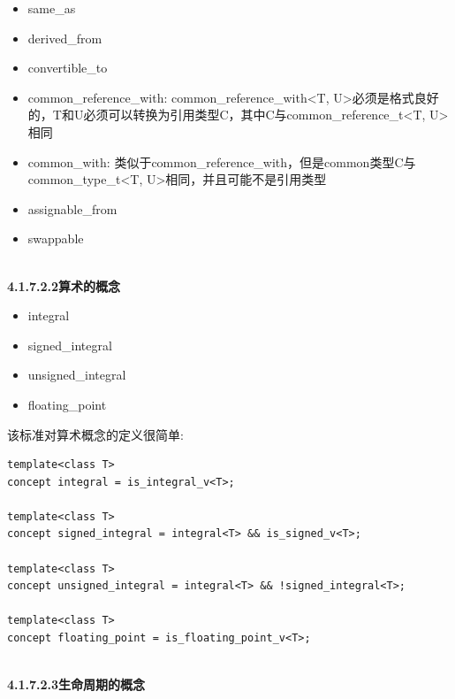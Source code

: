 \begin{itemize}
\item 
same\_as

\item 
derived\_from

\item 
convertible\_to

\item 
common\_reference\_with: common\_reference\_with<T, U>必须是格式良好的，T和U必须可以转换为引用类型C，其中C与common\_reference\_t<T, U>相同

\item 
common\_with: 类似于common\_reference\_with，但是common类型C与common\_type\_t<T, U>相同，并且可能不是引用类型

\item 
assignable\_from

\item 
swappable
\end{itemize}

\hspace*{\fill} \\ %
\noindent
\textbf{4.1.7.2.2\hspace{0.2cm}算术的概念}

\begin{itemize}
\item 
integral

\item 
signed\_integral

\item 
unsigned\_integral

\item 
floating\_point
\end{itemize}

该标准对算术概念的定义很简单:

\begin{lstlisting}[style=styleCXX]
template<class T>
concept integral = is_integral_v<T>;

template<class T>
concept signed_integral = integral<T> && is_signed_v<T>;

template<class T>
concept unsigned_integral = integral<T> && !signed_integral<T>;

template<class T>
concept floating_point = is_floating_point_v<T>;
\end{lstlisting}

\hspace*{\fill} \\ %
\noindent
\textbf{4.1.7.2.3\hspace{0.2cm}生命周期的概念}

